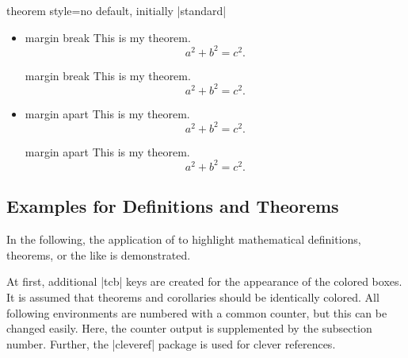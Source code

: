 \begin{docTcbKey}{theorem style}{=}{no default, initially |standard|}
\begin{itemize}
\begin{dispExample}
\begin{theorem}[theorem style=margin,left=10mm,oversize]{margin}{}
This is my theorem. \begin{equation*} a^2 + b^2 = c^2. \end{equation*}
\end{theorem}
\end{dispExample}
%
\item{}
\begin{dispExample}
\begin{theorem}[theorem style=margin break,left=10mm]{margin break}{}
This is my theorem. \begin{equation*} a^2 + b^2 = c^2. \end{equation*}
\end{theorem}
\begin{theorem}[theorem style=margin break,left=10mm,oversize]{margin break}{}
This is my theorem. \begin{equation*} a^2 + b^2 = c^2. \end{equation*}
\end{theorem}
\end{dispExample}
%
\item{}
\begin{dispExample}
\begin{theorem}[theorem style=margin apart,left=10mm]{margin apart}{}
This is my theorem. \begin{equation*} a^2 + b^2 = c^2. \end{equation*}
\end{theorem}
\begin{theorem}[theorem style=margin apart,left=10mm,oversize]{margin apart}{}
This is my theorem. \begin{equation*} a^2 + b^2 = c^2. \end{equation*}
\end{theorem}
\end{dispExample}
%
\end{itemize}
\end{docTcbKey}


%
\clearpage
\subsection{Examples for Definitions and Theorems}
In the following, the application of 
to highlight mathematical definitions, theorems, or the like is demonstrated.

At first, additional |tcb| keys are created for the appearance of
the colored boxes. It is assumed that theorems and corollaries should be
identically colored.
All following environments are numbered with a common counter, but this
can be changed easily. Here, the counter output is supplemented by
the subsection number.
Further, the |cleveref| package \cite{cubitt:2013a} is used for clever
references.

